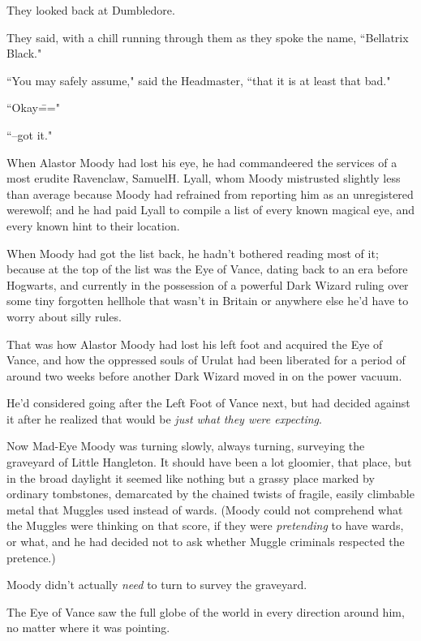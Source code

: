 They looked back at Dumbledore.

They said, with a chill running through them as they spoke the name, ``Bellatrix Black."

``You may safely assume," said the Headmaster, ``that it is at least that bad."

``Okay\==="

``\---got it."


When Alastor Moody had lost his eye, he had commandeered the services of a most erudite Ravenclaw, Samuel\?H. Lyall, whom Moody mistrusted slightly less than average because Moody had refrained from reporting him as an unregistered werewolf; and he had paid Lyall to compile a list of every known magical eye, and every known hint to their location.

When Moody had got the list back, he hadn't bothered reading most of it; because at the top of the list was the Eye of Vance, dating back to an era before Hogwarts, and currently in the possession of a powerful Dark Wizard ruling over some tiny forgotten hellhole that wasn't in Britain or anywhere else he'd have to worry about silly rules.

That was how Alastor Moody had lost his left foot and acquired the Eye of Vance, and how the oppressed souls of Urulat had been liberated for a period of around two weeks before another Dark Wizard moved in on the power vacuum.

He'd considered going after the Left Foot of Vance next, but had decided against it after he realized that would be \emph{just what they were expecting}.

Now Mad-Eye Moody was turning slowly, always turning, surveying the graveyard of Little Hangleton. It should have been a lot gloomier, that place, but in the broad daylight it seemed like nothing but a grassy place marked by ordinary tombstones, demarcated by the chained twists of fragile, easily climbable metal that Muggles used instead of wards. (Moody could not comprehend what the Muggles were thinking on that score, if they were \emph{pretending} to have wards, or what, and he had decided not to ask whether Muggle criminals respected the pretence.)

Moody didn't actually \emph{need} to turn to survey the graveyard.

The Eye of Vance saw the full globe of the world in every direction around him, no matter where it was pointing.


